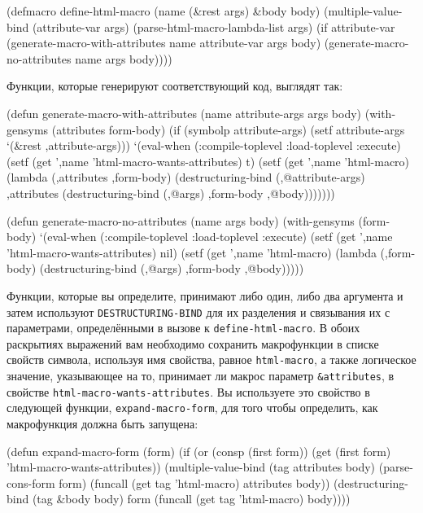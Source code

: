 \begin{myverb}
(defmacro define-html-macro (name (&rest args) &body body)
  (multiple-value-bind (attribute-var args)
      (parse-html-macro-lambda-list args)
    (if attribute-var
      (generate-macro-with-attributes name attribute-var args body)
      (generate-macro-no-attributes name args body))))
\end{myverb}

Функции, которые генерируют соответствующий код, выглядят так:

\begin{myverb}
(defun generate-macro-with-attributes (name attribute-args args body)
  (with-gensyms (attributes form-body)
    (if (symbolp attribute-args) (setf attribute-args `(&rest ,attribute-args)))
    `(eval-when (:compile-toplevel :load-toplevel :execute)
       (setf (get ',name 'html-macro-wants-attributes) t)
       (setf (get ',name 'html-macro) 
             (lambda (,attributes ,form-body)
               (destructuring-bind (,@attribute-args) ,attributes
                 (destructuring-bind (,@args) ,form-body
                   ,@body)))))))

(defun generate-macro-no-attributes (name args body)
  (with-gensyms (form-body)
    `(eval-when (:compile-toplevel :load-toplevel :execute)
       (setf (get ',name 'html-macro-wants-attributes) nil)
       (setf (get ',name 'html-macro)
             (lambda (,form-body)
               (destructuring-bind (,@args) ,form-body ,@body)))))
\end{myverb}

Функции, которые вы определите, принимают либо один, либо два аргумента и затем
используют \lstinline{DESTRUCTURING-BIND} для их разделения и связывания их с
параметрами, определёнными в вызове к \lstinline{define-html-macro}.  В обоих раскрытиях
выражений вам необходимо сохранить макрофункции в списке свойств символа, используя имя
свойства, равное \lstinline{html-macro}, а также логическое значение, указывающее на то,
принимает ли макрос параметр \lstinline!&attributes!, в свойстве
\lstinline{html-macro-wants-attributes}.  Вы используете это свойство в следующей функции,
\lstinline{expand-macro-form}, для того чтобы определить, как макрофункция должна быть
запущена:

\begin{myverb}
(defun expand-macro-form (form)
  (if (or (consp (first form))
          (get (first form) 'html-macro-wants-attributes))
    (multiple-value-bind (tag attributes body) (parse-cons-form form)
      (funcall (get tag 'html-macro) attributes body))
    (destructuring-bind (tag &body body) form
      (funcall (get tag 'html-macro) body))))
\end{myverb}

